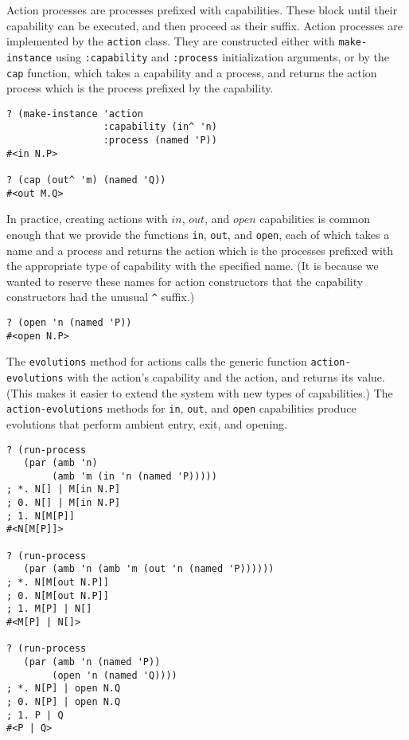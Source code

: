 \documentclass[12pt]{article}
\begin{document}
Action processes are processes prefixed with capabilities.
These block until their capability can be executed, and then proceed as their suffix.
Action processes are implemented by the \texttt{action} class.
They are constructed either with \texttt{make-instance} using \texttt{:capability} and \texttt{:process} initialization arguments, or by the \texttt{cap} function, which takes a capability and a process, and returns the action process which is the process prefixed by the capability.

\begin{verbatim}
? (make-instance 'action
                 :capability (in^ 'n)
                 :process (named 'P))
#<in N.P>

? (cap (out^ 'm) (named 'Q))
#<out M.Q>
\end{verbatim}

In practice, creating actions with $\mathit{in}$, $\mathit{out}$, and $\mathit{open}$ capabilities is common enough that we provide the functions \texttt{in}, \texttt{out}, and \texttt{open}, each of which takes a name and a process and returns the action which is the processes prefixed with the appropriate type of capability with the specified name.
(It is because we wanted to reserve these names for action constructors that the capability constructors had the unusual \texttt{\^} suffix.)

\begin{verbatim}
? (open 'n (named 'P))
#<open N.P>
\end{verbatim}

The \texttt{evolutions} method for actions calls the generic function \texttt{action-evolutions} with the action's capability and the action, and returns its value.
(This makes it easier to extend the system with new types of capabilities.)
The \texttt{action-evolutions} methods for \texttt{in}, \texttt{out}, and \texttt{open} capabilities produce evolutions that perform ambient entry, exit, and opening.

\begin{verbatim}
? (run-process 
   (par (amb 'n) 
        (amb 'm (in 'n (named 'P)))))
; *. N[] | M[in N.P]
; 0. N[] | M[in N.P]
; 1. N[M[P]]
#<N[M[P]]>

? (run-process
   (par (amb 'n (amb 'm (out 'n (named 'P))))))
; *. N[M[out N.P]]
; 0. N[M[out N.P]]
; 1. M[P] | N[]
#<M[P] | N[]>

? (run-process
   (par (amb 'n (named 'P))
        (open 'n (named 'Q))))
; *. N[P] | open N.Q
; 0. N[P] | open N.Q
; 1. P | Q
#<P | Q>
\end{verbatim}
\end{document}
